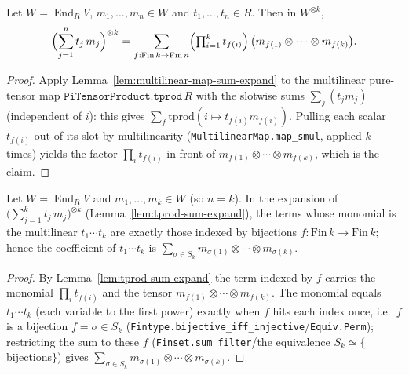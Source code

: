 \begin{lemma}
    \label{lem:tprod-sum-expand}
    Let $W = \operatorname{End}_R V$, $m_1, \ldots, m_n \in W$ and $t_1, \ldots, t_n \in R$. Then in
    $W^{\otimes k}$,
    \[
        \Bigl(\sum_{j=1}^{n} t_j\, m_j\Bigr)^{\otimes k}
          = \sum_{f : \mathrm{Fin}\,k \to \mathrm{Fin}\,n}
              \Bigl(\textstyle\prod_{i=1}^{k} t_{f(i)}\Bigr)\, \bigl(m_{f(1)} \otimes \cdots \otimes m_{f(k)}\bigr) .
    \]
\end{lemma}
\begin{proof}
    Apply Lemma~\ref{lem:multilinear-map-sum-expand} to the multilinear pure-tensor map
    $\texttt{PiTensorProduct.tprod}\,R$ with the slotwise sums $\sum_j (t_j m_j)$ (independent of $i$):
    this gives $\sum_{f} \mathrm{tprod}(i \mapsto t_{f(i)} m_{f(i)})$. Pulling each scalar $t_{f(i)}$ out of
    its slot by multilinearity (\texttt{MultilinearMap.map\_smul}, applied $k$ times) yields the factor
    $\prod_i t_{f(i)}$ in front of $m_{f(1)} \otimes \cdots \otimes m_{f(k)}$, which is the claim.
\end{proof}

\begin{lemma}
    \label{lem:multilinear-terms-are-perms}
    Let $W = \operatorname{End}_R V$ and $m_1, \ldots, m_k \in W$ (so $n = k$). In the expansion of
    $\bigl(\sum_{j=1}^{k} t_j\, m_j\bigr)^{\otimes k}$ (Lemma~\ref{lem:tprod-sum-expand}), the terms whose
    monomial is the multilinear $t_1 \cdots t_k$ are exactly those indexed by bijections $f : \mathrm{Fin}\,k
    \to \mathrm{Fin}\,k$; hence the coefficient of $t_1 \cdots t_k$ is
    $\sum_{\sigma \in S_k} m_{\sigma(1)} \otimes \cdots \otimes m_{\sigma(k)}$.
\end{lemma}
\begin{proof}
    By Lemma~\ref{lem:tprod-sum-expand} the term indexed by $f$ carries the monomial $\prod_i t_{f(i)}$ and
    the tensor $m_{f(1)} \otimes \cdots \otimes m_{f(k)}$. The monomial equals $t_1 \cdots t_k$ (each
    variable to the first power) exactly when $f$ hits each index once, i.e.\ $f$ is a bijection
    $f = \sigma \in S_k$ (\texttt{Fintype.bijective\_iff\_injective}/\texttt{Equiv.Perm}); restricting the
    sum to these $f$ (\texttt{Finset.sum\_filter}/the equivalence $S_k \simeq \{$bijections$\}$) gives
    $\sum_{\sigma \in S_k} m_{\sigma(1)} \otimes \cdots \otimes m_{\sigma(k)}$.
\end{proof}


